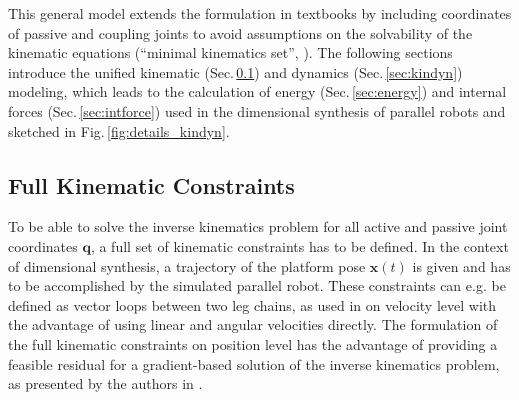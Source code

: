 \documentclass[fleqn,a4paper,10pt]{article}
\newcommand{\bm}[1]{\mathbf{#1}}
\renewcommand{\Phi}[1]{\varPhi{#1}}
\begin{document}
\begin{multicols}{2}
This general model extends the formulation in textbooks \cite{Merlet2006,BriotKha2015} by including coordinates of passive and coupling joints to avoid assumptions on the 	solvability of the kinematic equations (``minimal kinematics set'', \cite{Merlet2006}). 
The following sections introduce the unified kinematic (Sec.\,\ref{sec:kinematics}) and dynamics (Sec.\,\ref{sec:kindyn}) modeling, which leads to the calculation of energy (Sec.\,\ref{sec:energy}) and internal forces (Sec.\,\ref{sec:intforce}) used in the dimensional synthesis of parallel robots and sketched in Fig.\,\ref{fig:details_kindyn}.
\subsection{Full Kinematic Constraints}
\label{sec:kinematics}



To be able to solve the inverse kinematics problem for all active and passive joint coordinates $\bm{q}$, a full set of kinematic constraints has to be defined.
In the context of dimensional synthesis, a trajectory of the platform pose $\bm{x}(t)$ is given and has to be accomplished by the simulated parallel robot.
These constraints can e.g. be defined as vector loops between two leg chains, as used in \cite{Gogu2008} on velocity level with the advantage of using linear and angular velocities directly.
The formulation of the full kinematic constraints on position level has the advantage of providing a feasible residual for a gradient-based solution of the inverse kinematics problem, as presented by the authors in \cite{SchapplerTapOrt2019c}. 


\end{multicols}
\end{document}
